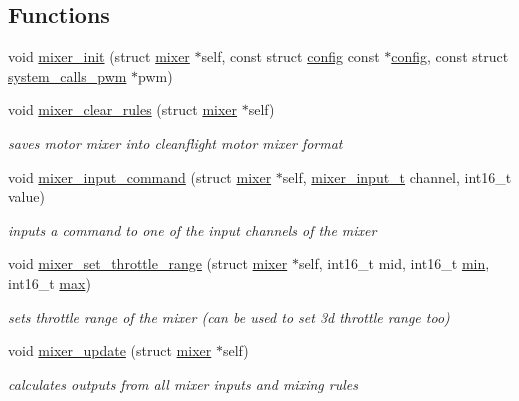 \subsection*{Functions}
\begin{DoxyCompactItemize}
\item 
void \hyperlink{group__MIXER_ga1ac8758754f82b6ad750ed377c154733}{mixer\+\_\+init} (struct \hyperlink{structmixer}{mixer} $\ast$self, const struct \hyperlink{structconfig}{config} const $\ast$\hyperlink{structconfig}{config}, const struct \hyperlink{structsystem__calls__pwm}{system\+\_\+calls\+\_\+pwm} $\ast$pwm)
\item 
void \hyperlink{group__MIXER_gadc257851e57bc3de20fe776f8fca0a78}{mixer\+\_\+clear\+\_\+rules} (struct \hyperlink{structmixer}{mixer} $\ast$self)
\begin{DoxyCompactList}\small\item\em saves motor mixer into cleanflight motor mixer format \end{DoxyCompactList}\item 
void \hyperlink{group__MIXER_gaedfa8863c1b4819082c4349bc4f053be}{mixer\+\_\+input\+\_\+command} (struct \hyperlink{structmixer}{mixer} $\ast$self, \hyperlink{config_2mixer_8h_a0d4a27769492fd12822190587e6b482a}{mixer\+\_\+input\+\_\+t} channel, int16\+\_\+t value)
\begin{DoxyCompactList}\small\item\em inputs a command to one of the input channels of the mixer \end{DoxyCompactList}\item 
void \hyperlink{group__MIXER_gabff36b1d8ccaf72b089c8776573a00e8}{mixer\+\_\+set\+\_\+throttle\+\_\+range} (struct \hyperlink{structmixer}{mixer} $\ast$self, int16\+\_\+t mid, int16\+\_\+t \hyperlink{config_2rx_8h_a1a1f4624f66ab0b2eb0b98316514c369}{min}, int16\+\_\+t \hyperlink{config_2rx_8h_ac66b569507cc273bbf83ce5dd5f70e84}{max})
\begin{DoxyCompactList}\small\item\em sets throttle range of the mixer (can be used to set 3d throttle range too) \end{DoxyCompactList}\item 
void \hyperlink{group__MIXER_ga724983e86f9da0e57f4aa4ec495d2d87}{mixer\+\_\+update} (struct \hyperlink{structmixer}{mixer} $\ast$self)
\begin{DoxyCompactList}\small\item\em calculates outputs from all mixer inputs and mixing rules \end{DoxyCompactList}\item 

\end{DoxyCompactItemize}
